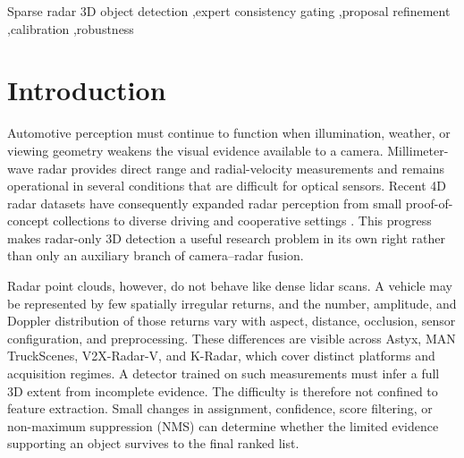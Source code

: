 \documentclass[preprint,12pt,times]{elsarticle}
\begin{document}
\begin{frontmatter}
\begin{abstract}
proposal mechanisms. These results show that protocol-bounded paired
no-regression behavior and maximum average accuracy are distinct objectives:
the selected expert-gated route provides
consistent paired gains at measurable post-processing cost under the evaluated
protocol, whereas confidence
quality alignment delivers larger average gains and improved calibration
without guaranteeing uniform improvement across diagnostics. The frozen
conversions provide frame-level IDs but no scene or vehicle keys. A numeric
$\pm1$ adjacency audit flags possible cross-split temporal correlation, including
80/80 K-Radar validation IDs adjacent to training IDs; the results therefore do
not establish scene-disjoint or deployment-level generalization.
\end{abstract}

\begin{keyword}
Sparse radar 3D object detection \sep expert consistency gating \sep proposal refinement \sep calibration \sep robustness
\end{keyword}

\end{frontmatter}

\section{Introduction}

Automotive perception must continue to function when illumination, weather,
or viewing geometry weakens the visual evidence available to a camera.
Millimeter-wave radar provides direct range and radial-velocity measurements
and remains operational in several conditions that are difficult for optical
sensors. Recent 4D radar datasets have consequently expanded radar perception
from small proof-of-concept collections to diverse driving and cooperative
settings \cite{paek2022kradar,yang2024v2xradar}. This progress makes
radar-only 3D detection a useful research problem in its own right rather than
only an auxiliary branch of camera--radar fusion.

Radar point clouds, however, do not behave like dense lidar scans. A vehicle
may be represented by few spatially irregular returns, and the number,
amplitude, and Doppler distribution of those returns vary with aspect,
distance, occlusion, sensor configuration, and preprocessing. These
differences are visible across Astyx, MAN TruckScenes, V2X-Radar-V, and
K-Radar, which cover distinct platforms and acquisition regimes. A detector
trained on such measurements must infer a full 3D extent from incomplete
evidence. The difficulty is therefore not confined to feature extraction.
Small changes in assignment, confidence, score filtering, or non-maximum
suppression (NMS) can determine whether the limited evidence supporting an
object survives to the final ranked list.
\end{document}
